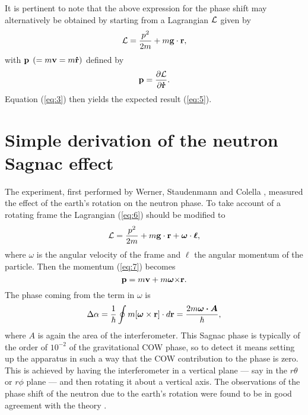 \documentclass[twocolumn,reprint,amsmath,amssymb]{revtex4}
\begin{document}
    It is pertinent to note that the above expression for the phase shift may
alternatively be obtained by starting from a Lagrangian  $\cal L$  given by
\begin{equation}
\label{eq:6}
{\cal L} = \frac{p^2}{2m} + m{\bf g \cdot r},
\end{equation}
with ${\bf p}$ $( = m{\bf v} = m{\bf {\dot r}})$ defined by 
\begin{equation}
\label{eq:7}
{\bf p} = \frac{\partial {\cal L}}{\partial {\bf \dot{r}}}.
\end{equation}
Equation (\ref{eq:3}) then yields the expected result (\ref{eq:5}).


\section{Simple derivation of the neutron Sagnac effect}
\label{sec:SimpleSAGNAC}

The experiment, first performed by Werner, Staudenmann and Colella 
\cite{2}, measured the effect of the earth's rotation on the neutron 
phase.  To take account of a rotating frame the Lagrangian (\ref{eq:6}) should 
be modified to 
\begin{equation}
\label{eq:8}
{\cal L} = \frac{p^2}{2m} + m{\bf g}\cdot {\bf r} + \bm{\omega}\cdot {\bm{\ell}},
\end{equation}
where $\omega$ is the angular velocity of the frame and ${\bm{\ell}}$ the angular 
momentum of the particle. Then the momentum (\ref{eq:7}) becomes
\begin{equation}
\label{eq:9}
{\bf p} = m {\bf v} + m\bm{\omega} {\bf \times r}. 
\end{equation}
The phase coming from the term in $\omega$ is
\begin{equation}
\label{eq:10}
\Delta \alpha 
= \frac{1}{\hbar} \oint m [\bm{\omega} 
\times {\bf r}]\cdot d{{\bf r}}  = \frac{2m \bm{\omega \cdot {A}}}{\hbar},
\end{equation}
where ${A}$ is again the area of the interferometer. This Sagnac phase is 
typically of the order of $10^{-2}$ of the gravitational COW phase, so 
to detect it means setting up the apparatus in such a way that the COW 
contribution to the phase is zero. This is achieved by having the interferometer 
in a vertical plane --- say in the $r\theta$ or $r\phi$ plane --- and then rotating 
it about a vertical axis. The observations of the phase shift of the neutron due 
to the earth's rotation were found to be in good agreement 
with the theory \cite{2}.
\end{document}
